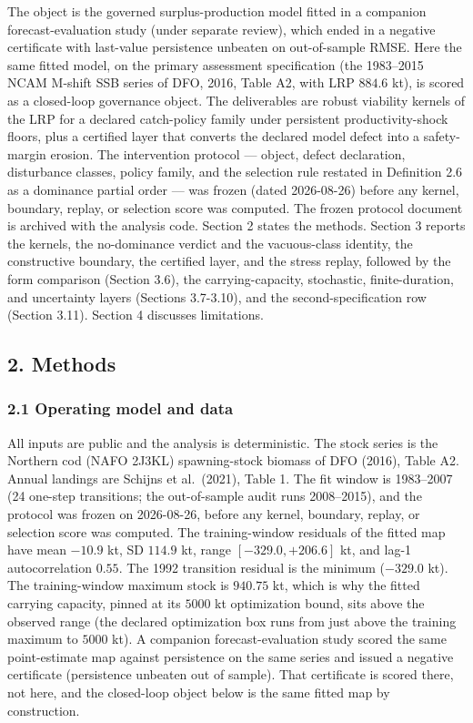 \documentclass[11pt]{article}
\begin{document}
The object is the governed surplus-production model fitted in a
companion forecast-evaluation study (under separate review), which ended
in a negative certificate with last-value persistence unbeaten on
out-of-sample RMSE. Here the same fitted model, on the primary
assessment specification (the 1983--2015 NCAM M-shift SSB series of DFO,
2016, Table A2, with LRP \(884.6\) kt), is scored as a closed-loop
governance object. The deliverables are robust viability kernels of the
LRP for a declared catch-policy family under persistent
productivity-shock floors, plus a certified layer that converts the
declared model defect into a safety-margin erosion. The intervention
protocol --- object, defect declaration, disturbance classes, policy
family, and the selection rule restated in Definition 2.6 as a dominance
partial order --- was frozen (dated 2026-08-26) before any kernel,
boundary, replay, or selection score was computed. The frozen protocol
document is archived with the analysis code. Section 2 states the
methods. Section 3 reports the kernels, the no-dominance verdict and the
vacuous-class identity, the constructive boundary, the certified layer,
and the stress replay, followed by the form comparison (Section 3.6),
the carrying-capacity, stochastic, finite-duration, and uncertainty
layers (Sections 3.7-3.10), and the second-specification row (Section
3.11). Section 4 discusses limitations.

\subsection{2. Methods}\label{methods}

\subsubsection{2.1 Operating model and
data}\label{operating-model-and-data}

All inputs are public and the analysis is deterministic. The stock
series is the Northern cod (NAFO 2J3KL) spawning-stock biomass of DFO
(2016), Table A2. Annual landings are Schijns et al.~(2021), Table 1.
The fit window is 1983--2007 (24 one-step transitions; the out-of-sample
audit runs 2008--2015), and the protocol was frozen on 2026-08-26,
before any kernel, boundary, replay, or selection score was computed.
The training-window residuals of the fitted map have mean \(-10.9\) kt,
SD \(114.9\) kt, range \([-329.0, +206.6]\) kt, and lag-1
autocorrelation \(0.55\). The 1992 transition residual is the minimum
(\(-329.0\) kt). The training-window maximum stock is \(940.75\) kt,
which is why the fitted carrying capacity, pinned at its \(5000\) kt
optimization bound, sits above the observed range (the declared
optimization box runs from just above the training maximum to \(5000\)
kt). A companion forecast-evaluation study scored the same
point-estimate map against persistence on the same series and issued a
negative certificate (persistence unbeaten out of sample). That
certificate is scored there, not here, and the closed-loop object below
is the same fitted map by construction.
\end{document}
